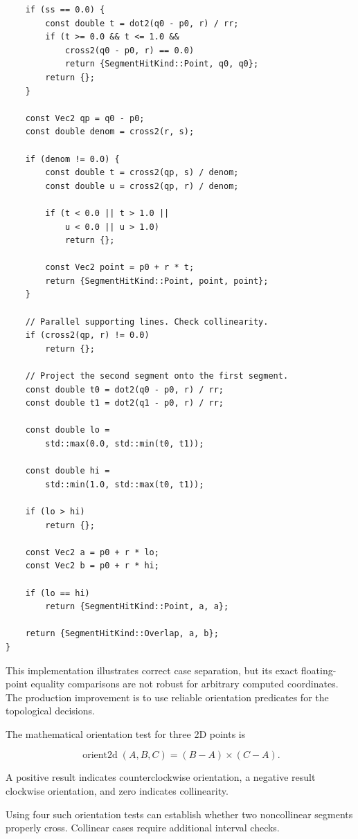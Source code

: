 \begin{verbatim}
    if (ss == 0.0) {
        const double t = dot2(q0 - p0, r) / rr;
        if (t >= 0.0 && t <= 1.0 &&
            cross2(q0 - p0, r) == 0.0)
            return {SegmentHitKind::Point, q0, q0};
        return {};
    }

    const Vec2 qp = q0 - p0;
    const double denom = cross2(r, s);

    if (denom != 0.0) {
        const double t = cross2(qp, s) / denom;
        const double u = cross2(qp, r) / denom;

        if (t < 0.0 || t > 1.0 ||
            u < 0.0 || u > 1.0)
            return {};

        const Vec2 point = p0 + r * t;
        return {SegmentHitKind::Point, point, point};
    }

    // Parallel supporting lines. Check collinearity.
    if (cross2(qp, r) != 0.0)
        return {};

    // Project the second segment onto the first segment.
    const double t0 = dot2(q0 - p0, r) / rr;
    const double t1 = dot2(q1 - p0, r) / rr;

    const double lo =
        std::max(0.0, std::min(t0, t1));

    const double hi =
        std::min(1.0, std::max(t0, t1));

    if (lo > hi)
        return {};

    const Vec2 a = p0 + r * lo;
    const Vec2 b = p0 + r * hi;

    if (lo == hi)
        return {SegmentHitKind::Point, a, a};

    return {SegmentHitKind::Overlap, a, b};
}
\end{verbatim}

This implementation illustrates correct case separation, but its exact floating-point equality comparisons are not robust for arbitrary computed coordinates. The production improvement is to use reliable orientation predicates for the topological decisions.

The mathematical orientation test for three 2D points is

\[
\operatorname{orient2d}(A,B,C) = (B-A)\times(C-A).
\]

A positive result indicates counterclockwise orientation, a negative result clockwise orientation, and zero indicates collinearity.

Using four such orientation tests can establish whether two noncollinear segments properly cross. Collinear cases require additional interval checks.

